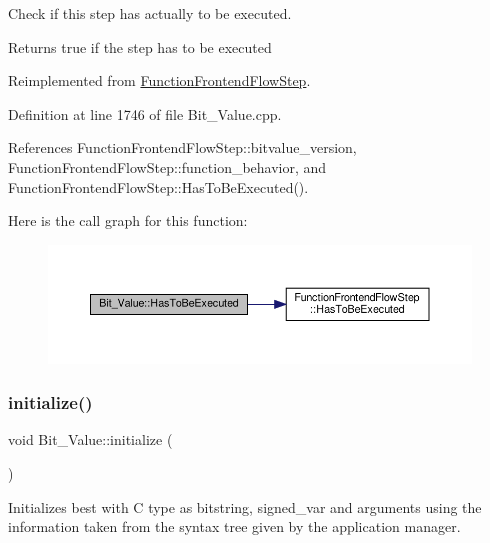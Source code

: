 Check if this step has actually to be executed. 

\begin{DoxyReturn}{Returns}
true if the step has to be executed 
\end{DoxyReturn}


Reimplemented from \hyperlink{classFunctionFrontendFlowStep_a12e786363530aa9533e4bd9380130d75}{Function\+Frontend\+Flow\+Step}.



Definition at line 1746 of file Bit\+\_\+\+Value.\+cpp.



References Function\+Frontend\+Flow\+Step\+::bitvalue\+\_\+version, Function\+Frontend\+Flow\+Step\+::function\+\_\+behavior, and Function\+Frontend\+Flow\+Step\+::\+Has\+To\+Be\+Executed().

Here is the call graph for this function\+:
\nopagebreak
\begin{figure}[H]
\begin{center}
\leavevmode
\includegraphics[width=350pt]{df/d4b/classBit__Value_abcdc2de278483e5b1771f6f90081330a_cgraph}
\end{center}
\end{figure}
\mbox{\label{classBit__Value_acb5ecbfd885e6478546792c4a446364c}} 
\subsubsection{\texorpdfstring{initialize()}{initialize()}}
{\footnotesize\ttfamily void Bit\+\_\+\+Value\+::initialize (\begin{DoxyParamCaption}{ }\end{DoxyParamCaption})\hspace{0.3cm}{\ttfamily [private]}}



Initializes best with C type as bitstring, signed\+\_\+var and arguments using the information taken from the syntax tree given by the application manager. 

